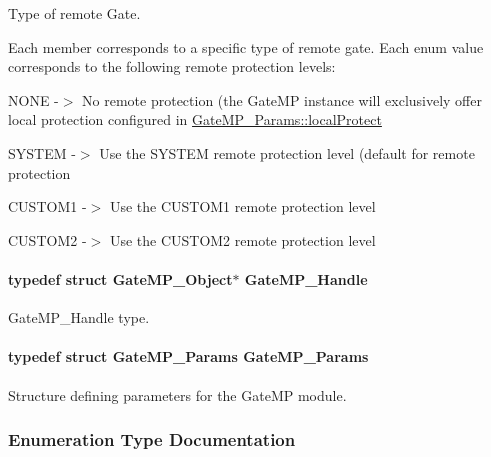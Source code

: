 Type of remote Gate. 

Each member corresponds to a specific type of remote gate. Each enum value corresponds to the following remote protection levels\-:
\begin{DoxyItemize}
\item N\-O\-N\-E -\/$>$ No remote protection (the Gate\-M\-P instance will exclusively offer local protection configured in \hyperlink{struct_gate_m_p___params_ac080433fff177b3d5b1cd5dcafc9e28c}{Gate\-M\-P\-\_\-\-Params\-::local\-Protect}
\item S\-Y\-S\-T\-E\-M -\/$>$ Use the S\-Y\-S\-T\-E\-M remote protection level (default for remote protection
\item C\-U\-S\-T\-O\-M1 -\/$>$ Use the C\-U\-S\-T\-O\-M1 remote protection level
\item C\-U\-S\-T\-O\-M2 -\/$>$ Use the C\-U\-S\-T\-O\-M2 remote protection level 
\end{DoxyItemize}
\paragraph[{Gate\-M\-P\-\_\-\-Handle}]{\setlength{\rightskip}{0pt plus 5cm}typedef struct Gate\-M\-P\-\_\-\-Object$\ast$ {\bf Gate\-M\-P\-\_\-\-Handle}}\label{_gate_m_p_8h_ad5bb259f928a14e98d973334bc60ebb3}


Gate\-M\-P\-\_\-\-Handle type. 

\paragraph[{Gate\-M\-P\-\_\-\-Params}]{\setlength{\rightskip}{0pt plus 5cm}typedef struct {\bf Gate\-M\-P\-\_\-\-Params}  {\bf Gate\-M\-P\-\_\-\-Params}}\label{_gate_m_p_8h_aa87249c5e69b88bfaa4ee817cacd3b42}


Structure defining parameters for the Gate\-M\-P module. 



\subsubsection{Enumeration Type Documentation}
